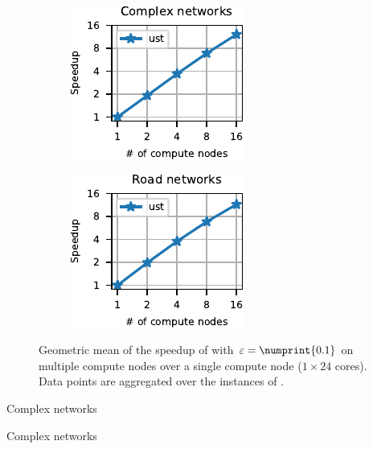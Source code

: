 \begin{figure}[tb]
\centering
\begin{subfigure}[t]{.45\textwidth}
\centering
\includegraphics[width=.7\textwidth]{sources/plots/el-clos/distributed-scalability-forest-cplx.pdf}
\end{subfigure}\hfill
\begin{subfigure}[t]{.45\textwidth}
\centering
\includegraphics[width=.7\textwidth]{sources/plots/el-clos/distributed-scalability-forest-road.pdf}
\end{subfigure}
\caption{Geometric mean of the speedup of \ust with $\epsilon = \numprint{0.1}$
on multiple compute nodes over a single compute node ($1\times 24$ cores).
Data points are aggregated over the instances of .}
\label{fig:el-clos:forest-distr-scal}
\end{figure}

\begin{table}[tb]
\centering\footnotesize
\setlength{\tabcolsep}{2pt}
\label{tab:el-clos:insts-forest-large}
\begin{subtable}[t]{.5\textwidth}
\centering
\caption{Complex networks}

\end{subtable}\hfill
\begin{subtable}[t]{.5\textwidth}
\centering
\caption{Complex networks}

\end{subtable}
\end{table}


